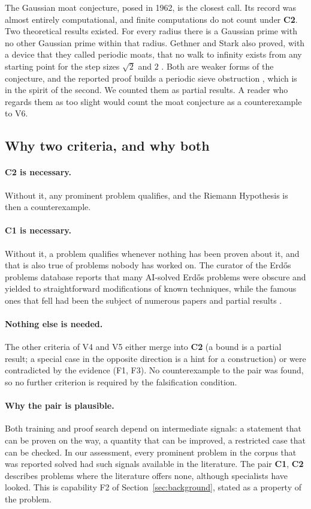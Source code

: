 \documentclass[11pt,a4paper]{article}
\theoremstyle{prob}
\newcommand{\Cone}{\textbf{C1}}
\newcommand{\Ctwo}{\textbf{C2}}
\begin{document}
The Gaussian moat conjecture, posed in 1962, is the closest call. Its record was almost entirely computational, and finite computations do not count under \Ctwo. Two theoretical results existed. For every radius there is a Gaussian prime with no other Gaussian prime within that radius. Gethner and Stark also proved, with a device that they called periodic moats, that no walk to infinity exists from any starting point for the step sizes $\sqrt2$ and $2$ \cite{gethnerstark}. Both are weaker forms of the conjecture, and the reported proof builds a periodic sieve obstruction \cite{openairepo}, which is in the spirit of the second. We counted them as partial results. A reader who regards them as too slight would count the moat conjecture as a counterexample to V6.

\subsection{Why two criteria, and why both}

\paragraph{\Ctwo{} is necessary.} Without it, any prominent problem qualifies, and the Riemann Hypothesis is then a counterexample.

\paragraph{\Cone{} is necessary.} Without it, a problem qualifies whenever nothing has been proven about it, and that is also true of problems nobody has worked on. The curator of the Erd\H{o}s problems database reports that many AI-solved Erd\H{o}s problems were obscure and yielded to straightforward modifications of known techniques, while the famous ones that fell had been the subject of numerous papers and partial results \cite{fme}.

\paragraph{Nothing else is needed.} The other criteria of V4 and V5 either merge into \Ctwo{} (a bound is a partial result; a special case in the opposite direction is a hint for a construction) or were contradicted by the evidence (F1, F3). No counterexample to the pair was found, so no further criterion is required by the falsification condition.

\paragraph{Why the pair is plausible.} Both training and proof search depend on intermediate signals: a statement that can be proven on the way, a quantity that can be improved, a restricted case that can be checked. In our assessment, every prominent problem in the corpus that was reported solved had such signals available in the literature. The pair \Cone{}, \Ctwo{} describes problems where the literature offers none, although specialists have looked. This is capability F2 of Section~\ref{sec:background}, stated as a property of the problem.
\end{document}
